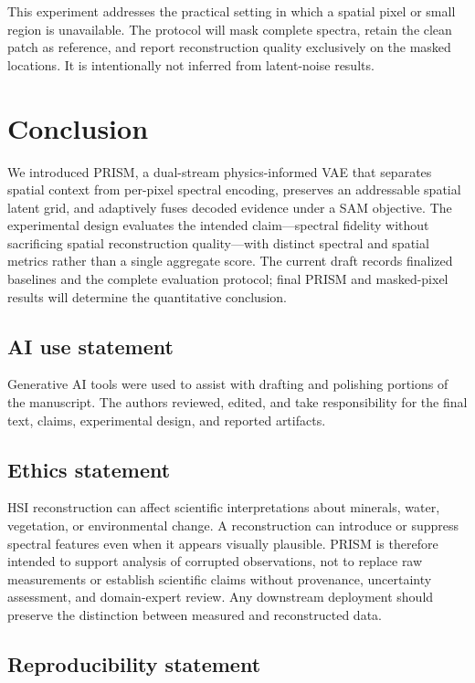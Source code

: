 \documentclass{article}
\begin{document}
This experiment addresses the practical setting in which a spatial pixel or small region is unavailable. The protocol will mask complete spectra, retain the clean patch as reference, and report reconstruction quality exclusively on the masked locations. It is intentionally not inferred from latent-noise results.

\section{Conclusion}

We introduced PRISM, a dual-stream physics-informed VAE that separates spatial context from per-pixel spectral encoding, preserves an addressable spatial latent grid, and adaptively fuses decoded evidence under a SAM objective. The experimental design evaluates the intended claim---spectral fidelity without sacrificing spatial reconstruction quality---with distinct spectral and spatial metrics rather than a single aggregate score. The current draft records finalized baselines and the complete evaluation protocol; final PRISM and masked-pixel results will determine the quantitative conclusion.

\subsection*{AI use statement}

Generative AI tools were used to assist with drafting and polishing portions of the manuscript. The authors reviewed, edited, and take responsibility for the final text, claims, experimental design, and reported artifacts.

\subsection*{Ethics statement}

HSI reconstruction can affect scientific interpretations about minerals, water, vegetation, or environmental change. A reconstruction can introduce or suppress spectral features even when it appears visually plausible. PRISM is therefore intended to support analysis of corrupted observations, not to replace raw measurements or establish scientific claims without provenance, uncertainty assessment, and domain-expert review. Any downstream deployment should preserve the distinction between measured and reconstructed data.

\subsection*{Reproducibility statement}
\end{document}
